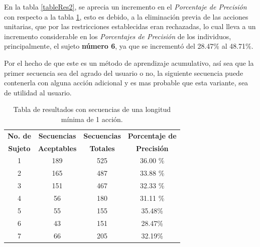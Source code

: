  
En la tabla \ref{tableRes2}, se aprecia un incremento en el \emph{Porcentaje de 
 Precisi\'on} con respecto a la tabla \ref{tableRes1}, esto es debido, a la
 eliminaci\'on previa de las acciones unitarias, que por las restricciones 
 establecidas eran rechazadas, lo cual lleva a un incremento considerable en los
 \emph{Porcentajes de Precisi\'on} de los individuos, principalmente, el sujeto
 \textbf{n\'umero 6}, ya que se increment\'o del 28.47\% al 48.71\%. 

\newpage

Por el hecho de que este es un m\'etodo de aprendizaje acumulativo, as\'i sea
 que la primer secuencia sea del agrado del usuario o no, la siguiente 
 secuencia puede contenerla con alguna acci\'on adicional y es mas 
 probable que esta variante, sea de utilidad al usuario. 

 
\begin{table}[]
\centering
\caption{Tabla de resultados con secuencias de una longitud m\'inima de 
 1 acci\'on.}
\begin{tabular}{cccc}
\hline
\textbf{No. de }	
&	\textbf{Secuencias }	
&   \textbf{Secuencias }	
&	\textbf{Porcentaje de }	\\

\textbf{Sujeto}
&	\textbf{Aceptables}
&	\textbf{Totales}
&	\textbf{Precisi\'on}
	\\ \hline

1				
&	189						
&	525						
&	36.00 \%		\\

2				
&	165						
&	487						
&	33.88 \%		\\

3
&	151
&	467
&	32.33 \%		\\

4
&	56
&	180
&	31.11 \%		\\

5
&	55
&	155
&	35.48\%			\\

6
&	43
&	151
&	28.47\%			\\

7
&	66
&	205
&	32.19\%			\\

\hline
\end{tabular}

\label{tableRes1}
\end{table}


